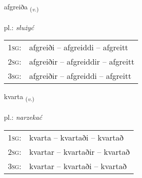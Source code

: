 \documentclass[frontgrid, backgrid]{flacards}\usepackage[]{graphicx}\usepackage[]{xcolor}
\begin{document}
\renewcommand{\flhead}{\vskip5pt \fboxsep=0pt {\small\bfseries\footnotesize Sagnorð | Verb}}
\renewcommand{\fcfoot}{\vskip5pt \fboxsep=0pt \hspace{2pt}{\small\bfseries\footnotesize 2K}}

\renewcommand{\blhead}{\vskip5pt {\small\bfseries\footnotesize Sagnorð | Verb }}
\renewcommand{\bcfoot}{\vskip5pt \hspace{2pt}{\small\bfseries\footnotesize 2K}}


{afgreiða \small{\textsubscript{(\textit{v.})}} \\[1ex] %
\textphonetic{[avkreiða]} \\
pl.: \emph{służyć} \\  [2ex]
\renewcommand*{\arraystretch}{0.8}
\begin{tabular}{p{1cm}l}
\textsc{1sg}: & afgreiði -- afgreiddi -- afgreitt \\ 
\textsc{2sg}: & afgreiðir -- afgreiddir -- afgreitt \\ 
\textsc{3sg}: & afgreiðir -- afgreiddi -- afgreitt \\ 
\end{tabular}
}

\renewcommand{\flhead}{\vskip5pt \fboxsep=0pt {\small\bfseries\footnotesize Sagnorð | Verb}}
\renewcommand{\fcfoot}{\vskip5pt \fboxsep=0pt \hspace{2pt}{\small\bfseries\footnotesize 2K}}

\renewcommand{\blhead}{\vskip5pt {\small\bfseries\footnotesize Sagnorð | Verb }}
\renewcommand{\bcfoot}{\vskip5pt \hspace{2pt}{\small\bfseries\footnotesize 2K}}


{kvarta \small{\textsubscript{(\textit{v.})}} \\[1ex] %
\textphonetic{[kʰvar̥ta]} \\
pl.: \emph{narzekać} \\  [2ex]
\renewcommand*{\arraystretch}{0.8}
\begin{tabular}{p{1cm}l}
\textsc{1sg}: & kvarta -- kvartaði -- kvartað \\ 
\textsc{2sg}: & kvartar -- kvartaðir -- kvartað \\ 
\textsc{3sg}: & kvartar -- kvartaði -- kvartað \\ 
\end{tabular}
}
\end{document}
